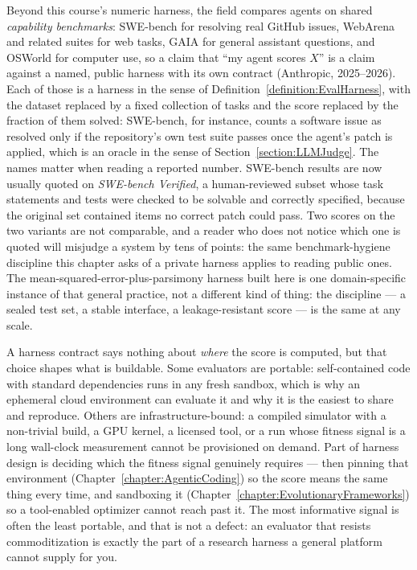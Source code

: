 Beyond this course's numeric harness, the field compares agents on shared \emph{capability benchmarks}: SWE-bench for resolving real GitHub issues, WebArena and related suites for web tasks, GAIA for general assistant questions, and OSWorld for computer use, so a claim that ``my agent scores $X$'' is a claim against a named, public harness with its own contract (Anthropic, 2025--2026).
Each of those is a harness in the sense of Definition~\ref{definition:EvalHarness}, with the dataset replaced by a fixed collection of tasks and the score replaced by the fraction of them solved: SWE-bench, for instance, counts a software issue as resolved only if the repository's own test suite passes once the agent's patch is applied, which is an oracle in the sense of Section~\ref{section:LLMJudge}.
The names matter when reading a reported number.
SWE-bench results are now usually quoted on \emph{SWE-bench Verified}, a human-reviewed subset whose task statements and tests were checked to be solvable and correctly specified, because the original set contained items no correct patch could pass.
Two scores on the two variants are not comparable, and a reader who does not notice which one is quoted will misjudge a system by tens of points: the same benchmark-hygiene discipline this chapter asks of a private harness applies to reading public ones.
The mean-squared-error-plus-parsimony harness built here is one domain-specific instance of that general practice, not a different kind of thing: the discipline --- a sealed test set, a stable interface, a leakage-resistant score --- is the same at any scale.

\begin{remark}
A harness contract says nothing about \emph{where} the score is computed, but that choice shapes what is buildable.
Some evaluators are portable: self-contained code with standard dependencies runs in any fresh sandbox, which is why an ephemeral cloud environment can evaluate it and why it is the easiest to share and reproduce.
Others are infrastructure-bound: a compiled simulator with a non-trivial build, a GPU kernel, a licensed tool, or a run whose fitness signal is a long wall-clock measurement cannot be provisioned on demand.
Part of harness design is deciding which the fitness signal genuinely requires --- then pinning that environment (Chapter~\ref{chapter:AgenticCoding}) so the score means the same thing every time, and sandboxing it (Chapter~\ref{chapter:EvolutionaryFrameworks}) so a tool-enabled optimizer cannot reach past it.
The most informative signal is often the least portable, and that is not a defect: an evaluator that resists commoditization is exactly the part of a research harness a general platform cannot supply for you.
\end{remark}

